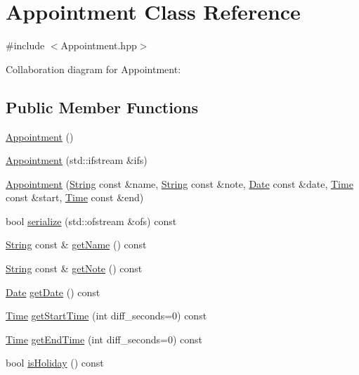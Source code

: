 \hypertarget{classAppointment}{}\section{Appointment Class Reference}
\label{classAppointment}


{\ttfamily \#include $<$Appointment.\+hpp$>$}



Collaboration diagram for Appointment\+:
\subsection*{Public Member Functions}
\begin{DoxyCompactItemize}
\item 
\hyperlink{classAppointment_a6f5ebbe07e02feaab6600c0f6297e694}{Appointment} ()
\item 
\hyperlink{classAppointment_a3b5b82331c630dcce3b1e724d0e6c48e}{Appointment} (std\+::ifstream \&ifs)
\item 
\hyperlink{classAppointment_a5ad76b006f94741008318f0a5053b7a0}{Appointment} (\hyperlink{classString}{String} const \&name, \hyperlink{classString}{String} const \&note, \hyperlink{classDate}{Date} const \&date, \hyperlink{classTime}{Time} const \&start, \hyperlink{classTime}{Time} const \&end)
\item 
bool \hyperlink{classAppointment_a2542a8dd24e926a2531f1d88bbf4dd88}{serialize} (std\+::ofstream \&ofs) const
\item 
\hyperlink{classString}{String} const  \& \hyperlink{classAppointment_ab2cbd469ff67c37c34a91c02a1ba9d35}{get\+Name} () const
\item 
\hyperlink{classString}{String} const  \& \hyperlink{classAppointment_aaf6078fe8f092e321a38d173bc7093c3}{get\+Note} () const
\item 
\hyperlink{classDate}{Date} \hyperlink{classAppointment_ac4f82720deaa4daf6679d1c60fadfb67}{get\+Date} () const
\item 
\hyperlink{classTime}{Time} \hyperlink{classAppointment_a577870c4d05eb584d58c61c98b9b65a0}{get\+Start\+Time} (int diff\+\_\+seconds=0) const
\item 
\hyperlink{classTime}{Time} \hyperlink{classAppointment_a5ba3b128ad963c9676af3fb199b98613}{get\+End\+Time} (int diff\+\_\+seconds=0) const
\item 
bool \hyperlink{classAppointment_a0307e814d106ba2b2314a28a9701efae}{is\+Holiday} () const
\item 

\end{DoxyCompactItemize}
